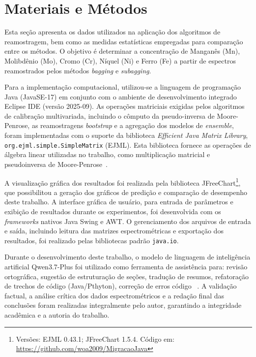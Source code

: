 \chapter{Materiais e Métodos}
\label{cha:metresult}

Esta seção apresenta os dados utilizados na aplicação dos algoritmos 
de reamostragem, bem como as medidas estatísticas empregadas para 
comparação entre os métodos. O objetivo é determinar a concentração 
de Manganês (Mn), Molibdênio (Mo), Cromo (Cr), Níquel (Ni) e Ferro 
(Fe) a partir de espectros reamostrados pelos métodos \textit{bagging} 
e \textit{subagging}.

Para a implementação computacional, utilizou-se a linguagem de programação Java (JavaSE-17) em conjunto com o ambiente de desenvolvimento integrado Eclipse \gls{IDE} (versão 2025-09). As operações matriciais exigidas pelos algoritmos de calibração multivariada, incluindo o cômputo da pseudo-inversa de Moore-Penrose, as reamostragens \textit{bootstrap} e a agregação dos modelos de \textit{ensemble}, foram implementadas com o suporte da biblioteca \textit{Efficient Java Matrix Library}, \texttt{org.ejml.simple.SimpleMatrix} (EJML). Esta biblioteca fornece as operações de álgebra linear utilizadas no trabalho, como multiplicação matricial e pseudoinversa de Moore-Penrose~\cite{ejml}.

A visualização gráfica dos resultados foi realizada pela biblioteca JFreeChart\footnote{Versões: EJML 0.43.1; JFreeChart 1.5.4. Código em: \url{https://github.com/woa2009/MigracaoJava}}, que possibilitou a geração dos gráficos de predição e comparação de desempenho deste trabalho. A interface gráfica de usuário, para entrada de parâmetros e exibição de resultados durante os experimentos, foi desenvolvida com os \textit{frameworks} nativos Java Swing e \gls{AWT}. O gerenciamento dos arquivos de entrada e saída, incluindo leitura das matrizes espectrométricas e exportação dos resultados, foi realizado pelas bibliotecas padrão \texttt{java.io}.


Durante o desenvolvimento deste trabalho, o modelo de linguagem de inteligência artificial Qwen3.7-Plus foi utilizado como ferramenta de assistência para: revisão ortográfica, sugestão de estruturação de seções, tradução de resumos, refatoração de trechos de código (Java/Pthyton), correção de erros código \LaTeXe~\cite{ alibaba2026qwen,kopka2004guide}. A validação factual, a análise crítica dos dados espectrométricos e a redação final das conclusões foram realizadas integralmente pelo autor, garantindo a integridade acadêmica e a autoria do trabalho.

